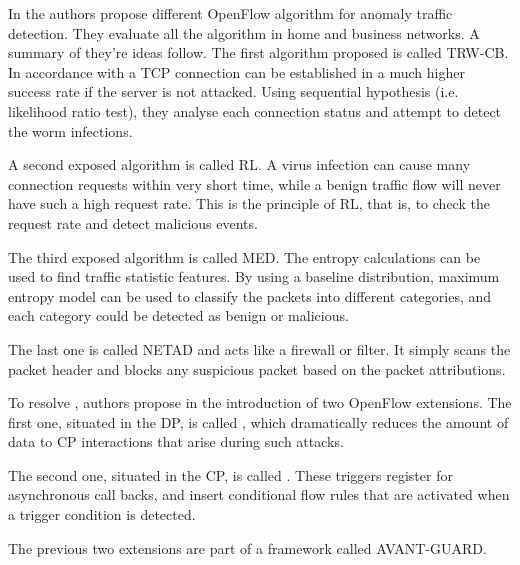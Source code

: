 In \cite{sdn-anomaly-traffic-detection} the authors propose different OpenFlow algorithm for anomaly traffic detection. They evaluate all the algorithm in home and business networks. A summary of they're ideas follow. The first algorithm proposed is called \ac{TRW-CB}. In accordance with a \acs{TCP} connection can be established in a much higher success rate if the server is not attacked. Using sequential hypothesis (i.e. likelihood ratio test), they analyse each connection status and attempt to detect the worm infections.

A second exposed algorithm is called \ac{RL}. A virus infection can cause many connection requests within very short time, while a benign traffic flow will never have such a high request rate. This is the principle of \ac{RL}, that is, to check the request rate and  detect malicious events. 

The third exposed algorithm is called \ac{MED}. The entropy calculations can be used to find traffic statistic features. By using a baseline distribution, maximum entropy model can be used to classify the packets into different categories, and each category could be detected as benign or malicious.

The last one is called \ac{NETAD} and acts like a firewall or filter. It simply scans the packet header and blocks any suspicious packet based on the packet attributions.

To resolve , authors propose in \cite{acm:openflow-weakness} the introduction of two OpenFlow extensions. The first one, situated in the \ac{DP}, is called , which dramatically reduces the amount of data to \ac{CP} interactions that arise during such attacks.

The second one, situated in the \ac{CP}, is called . These triggers register for asynchronous call backs, and insert conditional flow rules that are activated when a trigger condition is detected.

The previous two extensions are part of a framework called AVANT-GUARD.